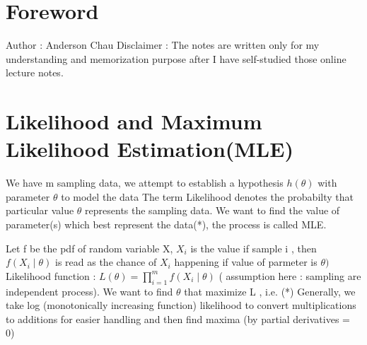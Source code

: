 \documentclass{article}
\begin{document}
\section{Foreword}
Author : Anderson Chau
\newline 
\newline 
Disclaimer : The notes are written only for my understanding and memorization purpose after I have self-studied those online lecture notes. 


\section{Likelihood and Maximum Likelihood Estimation(MLE)}
We have m sampling data, we attempt to establish a hypothesis \(h(\theta)\) with parameter \(\theta\) to model the data \newline
The term Likelihood denotes the probabilty that particular value \(\theta\) represents the sampling data.\newline 
We want to find the value of parameter(s) which best represent the data(*), the process is called MLE. \newline 

Let f be the pdf of random variable X, \(X_i\) is the value if sample i ,  then \(f(X_i \mid \theta)\) is read as the chance of \(X_i\) happening if value of parmeter is \(\theta)\) \newline  \newline 
Likelihood function : \(L(\theta) = \prod_{i=1}^{m} f(X_i \mid \theta)\) ( assumption here : sampling are independent process). We want to find \(\theta\) that maximize  L , i.e. (*) \newline
Generally, we take log (monotonically increasing function) likelihood to convert multiplications to additions for easier handling  and then find maxima (by partial derivatives = 0) 
\end{document}
